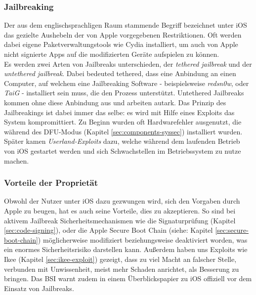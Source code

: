 	\subsubsection{Jailbreaking}\label{sec:jailbreaking}
		Der aus dem englischsprachligen Raum stammende Begriff bezeichnet unter iOS
		das gezielte Aushebeln der von Apple vorgegebenen Restriktionen. Oft werden
		dabei eigene Paketverwaltungstools wie
		Cydia\cite{Cydia2015} installiert, um auch von Apple nicht
		signierte Apps auf die modifizierten Geräte aufspielen zu können.\\
		Es werden zwei Arten von Jailbreaks unterschieden, der \textsl{tethered
		jailbreak} und der \textsl{untethered jailbreak}. Dabei bedeuted tethered,
		dass eine Anbindung an einen Computer, auf welchem eine Jailbreaking Software
		- beispielsweise \textsl{redsn0w}, oder	\textsl{TaiG} - installiert sein muss, die
		den Prozess unterstützt. Untethered Jailbreaks kommen ohne diese Anbindung aus
		und arbeiten autark. Das Prinzip des Jailbreakings ist dabei immer das selbe:
		es wird mit Hilfe eines Exploits das System kompromittiert. Zu Beginn wurden oft
		Hardwarefehler ausgenutzt, die während des
		DFU-Modus (Kapitel \ref{sec:components-syssec}) installiert wurden.
		Später kamen \textsl{Userland-Exploits} dazu, welche während dem
		laufenden Betrieb von iOS gestartet werden und sich Schwachstellen im
		Betriebssystem zu nutze machen.
	
	\subsubsection{Vorteile der Proprietät}
		Obwohl der Nutzer unter iOS dazu gezwungen wird, sich den Vorgaben durch Apple
		zu beugen, hat es auch seine Vorteile, dies zu akzeptieren. So sind bei
		aktivem Jailbreak Sicherheitsmechanismen wie die Signaturprüfung (Kapitel
		\ref{sec:code-signing}), oder die Apple Secure Boot	Chain (siehe: Kapitel
		\ref{sec:secure-boot-chain}) möglicherweise modifiziert beziehungsweise
		deaktiviert worden, was ein enormes Sicherheitsrisiko darstellen kann.
		Außerdem haben uns Exploits wie Ikee (Kapitel \ref{sec:ikee-exploit})
		gezeigt, dass zu viel Macht an falscher Stelle, verbunden mit Unwissenheit,
		meist mehr Schaden anrichtet, als Besserung zu bringen. Das BSI warnt
		zudem in einem Überblickspapier zu iOS offiziell vor dem Einsatz von
		Jailbreaks\cite{BSIJailbreak2013}.
